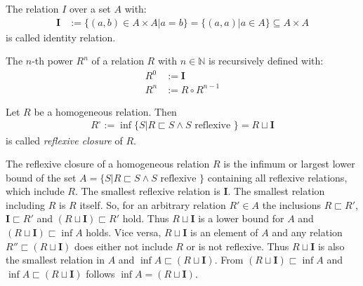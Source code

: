 \begin{definition}
The relation $I$ over a set $A$ with:
\begin{align}
\mathbf{I} &:= \{ (a,b) \in A \times A | a = b \} = \{ (a,a) | a \in A \} \subseteq A \times A
\end{align}
is called identity relation.
\end{definition}

\begin{definition}
The $n$-th power $R^n$ of a relation $R$ with $n \in \mathbb{N}$ is  recursively defined with:
\begin{align}
R^{0} &:= \mathbf{I}
\\R^{n} &:= R \circ R^{n-1}
\end{align}
\end{definition}


\begin{definition}
Let $R$ be a homogeneous relation.
Then
\begin{align}
R^\circ
:= \inf \{ S | R \sqsubset S \wedge S \text{ reflexive } \}
= R \sqcup \mathbf{I}
\end{align}
is called \emph{reflexive closure} of $R$.
\end{definition}

The reflexive closure of a homogeneous relation $R$ is the infimum or largest lower bound of the set $A = \{ S | R \sqsubset S \wedge S \text{ reflexive } \}$ containing all reflexive relations, which include $R$.
The smallest reflexive relation is $\mathbf{I}$.
The smallest relation including $R$ is $R$ itself.
So, for an arbitrary relation $R' \in A$ the inclusions $R \sqsubset R'$, $\mathbf{I} \sqsubset R'$ and $(R \sqcup \mathbf{I}) \sqsubset R'$ hold.
Thus $R \sqcup \mathbf{I}$ is a lower bound for $A$ and $(R \sqcup \mathbf{I}) \sqsubset \inf A$ holds.
Vice versa, $R \sqcup \mathbf{I}$ is an element of $A$ and any relation $R'' \sqsubset (R \sqcup \mathbf{I})$ does either not include $R$ or is not reflexive.
Thus $R \sqcup \mathbf{I}$ is also the smallest relation in $A$ and $\inf A \sqsubset (R \sqcup \mathbf{I})$.
From $(R \sqcup \mathbf{I}) \sqsubset \inf A$ and $\inf A \sqsubset (R \sqcup \mathbf{I})$ follows $\inf A = (R \sqcup \mathbf{I})$.


